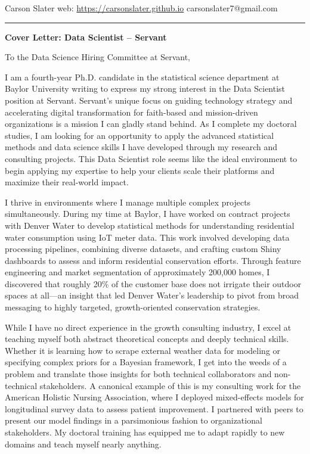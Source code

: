 \documentclass[11pt]{article}
\begin{document}
\noindent
Carson Slater \hfill web: \href{https://carsonslater.github.io}{https://carsonslater.github.io} \hfill carsonslater7@gmail.com \\
\rule{\textwidth}{0.4pt}

\vspace{1.5em}

\begin{center}
    \Large \textbf{Cover Letter: Data Scientist -- Servant}
\end{center}

\vspace{1.5em}

\noindent
To the Data Science Hiring Committee at Servant,

\vspace{1em}

I am a fourth-year Ph.D. candidate in the statistical science department at Baylor University writing to express my strong interest in the Data Scientist position at Servant. Servant’s unique focus on guiding technology strategy and accelerating digital transformation for faith-based and mission-driven organizations is a mission I can gladly stand behind. As I complete my doctoral studies, I am looking for an opportunity to apply the advanced statistical methods and data science skills I have developed through my research and consulting projects. This Data Scientist role seems like the ideal environment to begin applying my expertise to help your clients scale their platforms and maximize their real-world impact.

I thrive in environments where I manage multiple complex projects simultaneously. During my time at Baylor, I have worked on contract projects with Denver Water to develop statistical methods for understanding residential water consumption using IoT meter data. This work involved developing data processing pipelines, combining diverse datasets, and crafting custom Shiny dashboards to assess and inform residential conservation efforts. Through feature engineering and market segmentation of approximately 200,000 homes, I discovered that roughly 20\% of the customer base does not irrigate their outdoor spaces at all—an insight that led Denver Water’s leadership to pivot from broad messaging to highly targeted, growth-oriented conservation strategies.

While I have no direct experience in the growth consulting industry, I excel at teaching myself both abstract theoretical concepts and deeply technical skills. Whether it is learning how to scrape external weather data for modeling or specifying complex priors for a Bayesian framework, I get into the weeds of a problem and translate those insights for both technical collaborators and non-technical stakeholders. A canonical example of this is my consulting work for the American Holistic Nursing Association, where I deployed mixed-effects models for longitudinal survey data to assess patient improvement. I partnered with peers to present our model findings in a parsimonious fashion to organizational stakeholders. My doctoral training has equipped me to adapt rapidly to new domains and teach myself nearly anything.
\end{document}
